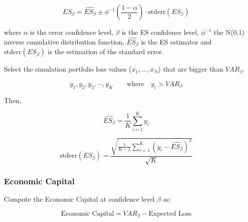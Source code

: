 \documentclass[a4paper,12pt,final]{article}
\begin{document}
\begin{displaymath}
ES_{\beta} = \widehat{ES_{\beta}} \pm \phi^{-1}\left(\frac{1-\alpha}{2}\right) \cdot \textrm{stderr}(ES_{\beta})
\end{displaymath}

where $\alpha$ is the error confidence level, $\beta$ is the ES confidence 
level, $\phi^{-1}$ the N(0,1) inverse cumulative distribution function, 
$\widehat{ES_{\beta}}$ is the ES estimator and $\textrm{stderr}(ES_{\beta})$
is the estimation of the standard error.
\newline

Select the simulation portfolio loss values ($x_1, ..., x_N$) that are bigger 
than $VAR_{\beta}$.

\begin{displaymath}
y_1, y_2, y_3, \cdots, y_K \qquad \textrm{where} \quad y_i > VAR_{\beta}
\end{displaymath}

Then,

\begin{displaymath}
\widehat{ES_{\beta}} = \frac{1}{K} \sum_{i=1}^{K} y_i
\end{displaymath}

\begin{displaymath}
\textrm{stderr}(ES_{\beta}) =
\frac{\sqrt{\frac{1}{K-1} \sum_{i=1}^{K} \left( y_i - \widehat{ES_{\beta}} \right)^2}}{\sqrt{K}}
\end{displaymath}

\subsubsection{Economic Capital}
Compute the Economic Capital at confidence level $\beta$ as:

\begin{displaymath}
\textrm{Economic Capital} = VAR_{\beta} - \textrm{Expected Loss}
\end{displaymath}

\end{document}
